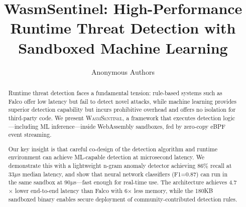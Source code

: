 \documentclass[runningheads]{llncs}
\begin{document}
\title{WasmSentinel: High-Performance Runtime Threat Detection with Sandboxed Machine Learning}

\author{Anonymous Authors}

\maketitle

\begin{abstract}
Runtime threat detection faces a fundamental tension: rule-based systems such as Falco offer low latency but fail to detect novel attacks, while machine learning provides superior detection capability but incurs prohibitive overhead and offers no isolation for third-party code.
We present \textsc{WasmSentinel}, a framework that executes detection logic---including ML inference---inside WebAssembly sandboxes, fed by zero-copy eBPF event streaming.

Our key insight is that careful co-design of the detection algorithm and runtime environment can achieve ML-capable detection at microsecond latency.
We demonstrate this with a lightweight n-gram anomaly detector achieving 86\% recall at 33$\mu$s median latency, and show that neural network classifiers (F1=0.87) can run in the same sandbox at 90$\mu$s---fast enough for real-time use.
The architecture achieves 4.7$\times$ lower end-to-end latency than Falco with 6$\times$ less memory, while the 180KB sandboxed binary enables secure deployment of community-contributed detection rules.

\end{abstract}















\end{document}
